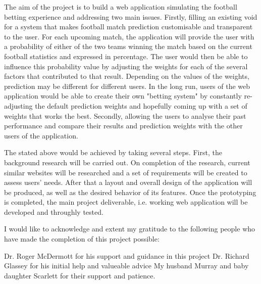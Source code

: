 \beforeabstract
{}
The aim of the project is to build a web application simulating the football betting experience and addressing two main issues. Firstly, filling an existing void for a system that makes football match prediction customisable and transparent to the user. For each upcoming match, the application will provide the user with a probability of either of the two teams winning the match based on the current football statistics and expressed in percentage. The user would then be able to influence this probability value by adjusting the weights for each of the several factors that contributed to that result. Depending on the values of the weights, prediction may be different for different users. In the long run, users of the web application would be able to create their own "betting system" by constantly re-adjusting the default prediction weights and hopefully coming up with a set of weights that works the best. Secondly, allowing the users to analyse their past performance and compare their results and prediction weights with the other users of the application.

The stated above would be achieved by taking several steps. First, the background research will be carried out. On completion of the research, 
current similar websites will be researched and a set of requirements will be created to assess users’ needs. After that a layout and overall design of the application will be produced, as well as the desired behavior of its features. Once the prototyping is completed, the main project deliverable, i.e. working web application will be developed and throughly tested. 

I would like to acknowledge and extent my gratitude to the following people who have made the completion of this project possible:

Dr. Roger McDermott for his support and guidance in this project
Dr. Richard Glassey for his initial help and valueable advice
My husband Murray and baby daughter Scarlett for their support and patience.

\afterpreface 
\afterabstract
